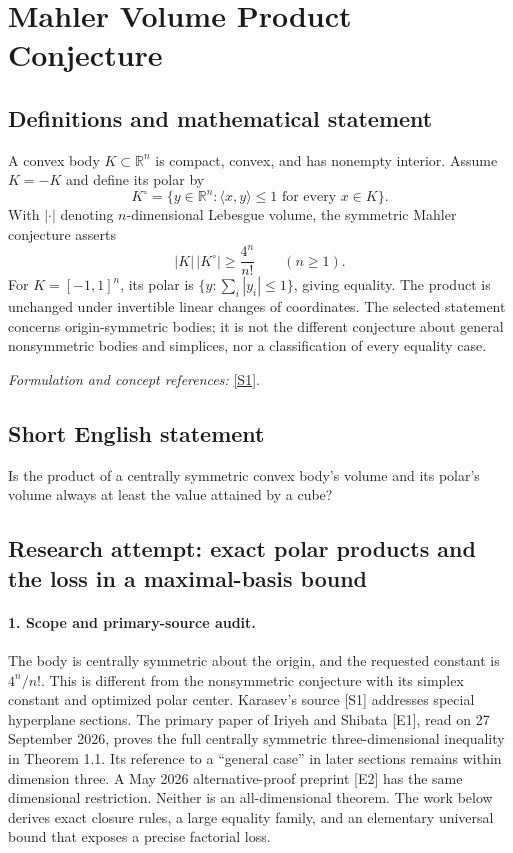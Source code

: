 \documentclass[11pt]{article}
\begin{document}
\section*{\texorpdfstring{Mahler Volume Product Conjecture}{Mahler Volume Product Conjecture}}\label{statement}
\subsection{Definitions and mathematical statement}
A convex body $K\subset{\mathbb{R}}^n$ is compact, convex, and has nonempty interior. Assume $K=-K$ and define its polar by
\[
 K^\circ=\{y\in{\mathbb{R}}^n:\langle x,y\rangle\le1\text{ for every }x\in K\}.
\]
With $|\cdot|$ denoting $n$-dimensional Lebesgue volume, the symmetric Mahler conjecture asserts
\[
 |K|\,|K^\circ|\ge\frac{4^n}{n!}\qquad(n\ge1).
\]
For $K=[-1,1]^n$, its polar is $\{y:\sum_i|y_i|\le1\}$, giving equality. The product is unchanged under invertible linear changes of coordinates. The selected statement concerns origin-symmetric bodies; it is not the different conjecture about general nonsymmetric bodies and simplices, nor a classification of every equality case.
\par\smallskip\textit{Formulation and concept references:} \href{https://arxiv.org/pdf/1902.08971}{[S1]}.

\subsection{Short English statement}
Is the product of a centrally symmetric convex body's volume and its polar's volume always at least the value attained by a cube?
\subsection{Research attempt: exact polar products and the loss in a maximal-basis bound}
\paragraph{1. Scope and primary-source audit.}
The body is centrally symmetric about the origin, and the requested constant is $4^n/n!$. This is different from the nonsymmetric conjecture with its simplex constant and optimized polar center. Karasev's source [S1] addresses special hyperplane sections. The primary paper of Iriyeh and Shibata [E1], read on 27 September 2026, proves the full centrally symmetric three-dimensional inequality in Theorem 1.1. Its reference to a ``general case'' in later sections remains within dimension three. A May 2026 alternative-proof preprint [E2] has the same dimensional restriction. Neither is an all-dimensional theorem. The work below derives exact closure rules, a large equality family, and an elementary universal bound that exposes a precise factorial loss.
\end{document}
